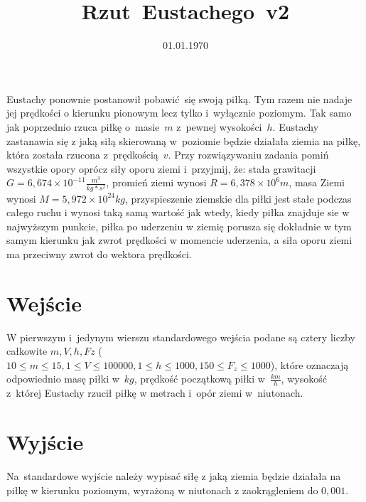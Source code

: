 \documentclass[zad]{soigstyl}
\date{01.01.1970}
\title{\mbox{Rzut Eustachego v2}}
\begin{document}
\begin{tasktext}%
    \noindent
    Eustachy ponownie postanowił pobawić~się swoją piłką. Tym razem nie nadaje jej prędkości o kierunku pionowym lecz tylko i~wyłącznie poziomym. Tak samo jak poprzednio rzuca piłkę o~masie~$m$ z~pewnej wysokości~$h$. Eustachy zastanawia się z jaką siłą skierowaną w~poziomie będzie działała ziemia na piłkę, która została rzucona z~prędkością~$v$. Przy rozwiązywaniu zadania pomiń wszystkie opory oprócz siły oporu ziemi i~przyjmij, że: stała grawitacji $G = 6,674 \times 10^{-11}\frac{m^3}{kg*s^2}$, promień ziemi wynosi $R = 6,378 \times 10^{6} m$, masa Ziemi wynosi $M=5,972 \times 10^{24} kg$, przyspieszenie ziemskie dla piłki jest stałe podczas całego ruchu i wynosi taką samą wartość jak wtedy, kiedy piłka znajduje sie w najwyższym punkcie, piłka po uderzeniu w ziemię porusza się dokładnie w tym samym kierunku jak zwrot prędkości w momencie uderzenia, a siła oporu ziemi ma przeciwny zwrot do wektora prędkości.
	
    	\section{Wejście}
	W pierwszym i~jedynym wierszu standardowego wejścia podane są cztery liczby całkowite $m, V, h, Fz$ ($10 \leqslant m \leqslant 15, 1 \leqslant V \leqslant 100000, 1 \leqslant h \leqslant 1000, 150 \leqslant F_z \leqslant 1000$), które oznaczają odpowiednio masę piłki w~$kg$, prędkość początkową piłki w~$\frac{km}{h}$, wysokość z~której Eustachy rzucił piłkę w metrach i~opór ziemi w~niutonach.

	\section{Wyjście}
	Na~standardowe wyjście należy wypisać siłę z jaką ziemia będzie działała na piłkę w kierunku poziomym, wyrażoną w niutonach z zaokrągleniem do $0,001$.
	
	\oigprzyklady
\end{tasktext}
\end{document}
